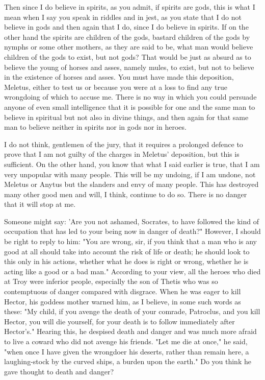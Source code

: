 Then since I do believe in spirits, as you admit, if spirits are gods, this is what I mean when
I say you speak in riddles and in jest, as you state that I do not believe in gods and then again that
I do, since I do believe in spirits. If on the other hand the spirits are children of the gods, bastard
children of the gods by nymphs or some other mothers, as they are said to be, what man would
believe children of the gods to exist, but not gods? That would be just as absurd as to believe the
young of horses and asses, namely mules, to exist, but not to believe in the existence of horses and
asses. You must have made this deposition, Meletus, either to test us or because you were at a loss
to find any true wrongdoing of which to accuse me. There is no way in which you could persuade
anyone of even small intelligence that it is possible for one and the same man to believe in spiritual
but not also in divine things, and then again for that same man to believe neither in spirits nor in
gods nor in heroes.

I do not think, gentlemen of the jury, that it requires a prolonged defence to prove that I am
not guilty of the charges in Meletus' deposition, but this is sufficient. On the other hand, you know
that what I said earlier is true, that I am very unpopular with many people. This will be my
undoing, if I am undone, not Meletus or Anytus but the slanders and envy of many people. This
has destroyed many other good men and will, I think, continue to do so. There is no danger that
it will stop at me.

Someone might say: 'Are you not ashamed, Socrates, to have followed the kind of occupation
that has led to your being now in danger of death?" However, I should be right to reply to him:
"You are wrong, sir, if you think that a man who is any good at all should take into account the risk
of life or death; he should look to this only in his actions, whether what he does is right or wrong,
whether he is acting like a good or a bad man." According to your view, all the heroes who died
at Troy were inferior people, especially the son of Thetis who was so contemptuous of danger
compared with disgrace. When he was eager to kill Hector, his goddess mother warned him, as I
believe, in some such words as these: "My child, if you avenge the death of your comrade,
Patroclus, and you kill Hector, you will die yourself, for your death is to follow immediately after
Hector's." Hearing this, he despised death and danger and was much more afraid to live a coward
who did not avenge his friends. "Let me die at once," he said, "when once I have given the
wrongdoer his deserts, rather than remain here, a laughing-stock by the curved ships, a burden
upon the earth." Do you think he gave thought to death and danger?

